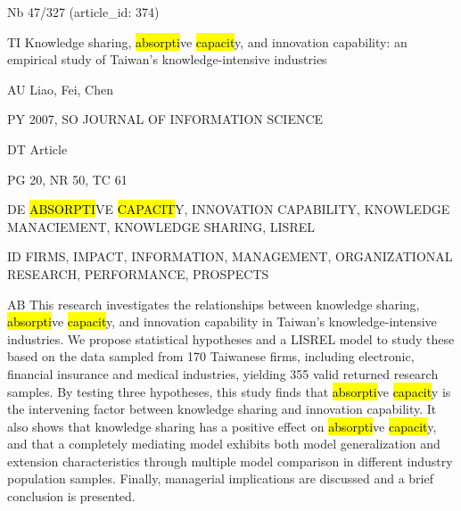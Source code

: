 \documentclass[a4paper]{article}
\begin{document}
\vspace*{-2cm}
Nb \tabto{0cm}47/327 (article\_id: 374)\par
TI \tabto{0cm}Knowledge sharing, \hl{absorpti}ve \hl{capacit}y, and innovation capability: an empirical study of Taiwan's knowledge-intensive industries\par
AU \tabto{0cm}Liao, Fei, Chen\par
PY \tabto{0cm}2007, SO JOURNAL OF INFORMATION SCIENCE\par
DT \tabto{0cm}Article\par
PG \tabto{0cm}20, NR 50, TC 61\par
DE \tabto{0cm}\hl{ABSORPTI}VE \hl{CAPACIT}Y, INNOVATION CAPABILITY, KNOWLEDGE MANACIEMENT, KNOWLEDGE SHARING, LISREL\par
ID \tabto{0cm}FIRMS, IMPACT, INFORMATION, MANAGEMENT, ORGANIZATIONAL RESEARCH, PERFORMANCE, PROSPECTS\par
AB \tabto{0cm}This research investigates the relationships between knowledge sharing, \hl{absorpti}ve \hl{capacit}y, and innovation capability in Taiwan's knowledge-intensive industries. We propose statistical hypotheses and a LISREL model to study these based on the data sampled from 170 Taiwanese firms, including electronic, financial insurance and medical industries, yielding 355 valid returned research samples. By testing three hypotheses, this study finds that \hl{absorpti}ve \hl{capacit}y is the intervening factor between knowledge sharing and innovation capability. It also shows that knowledge sharing has a positive effect on \hl{absorpti}ve \hl{capacit}y, and that a completely mediating model exhibits both model generalization and extension characteristics through multiple model comparison in different industry population samples. Finally, managerial implications are discussed and a brief conclusion is presented.\par
\clearpage
\end{document}
